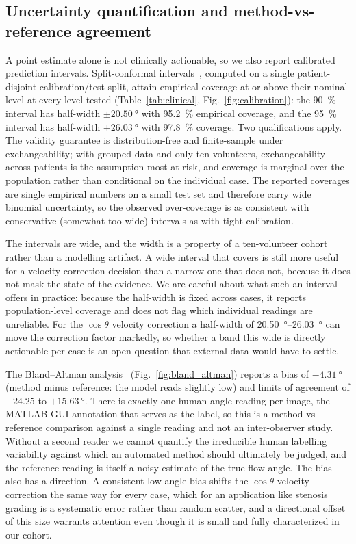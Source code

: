 \subsection{Uncertainty quantification and method-vs-reference agreement}

A point estimate alone is not clinically actionable, so we also report calibrated
prediction intervals. Split-conformal intervals~\citep{Vovk2005,Lei2018}, computed
on a single patient-disjoint calibration/test split, attain empirical coverage at or
above their nominal level at every level tested (Table~\ref{tab:clinical},
Fig.~\ref{fig:calibration}): the \SI{90}{\percent} interval has half-width
$\pm\SI{20.50}{\degree}$ with \SI{95.2}{\percent} empirical coverage, and the
\SI{95}{\percent} interval has half-width $\pm\SI{26.03}{\degree}$ with
\SI{97.8}{\percent} coverage. Two qualifications apply. The validity guarantee is
distribution-free and finite-sample under exchangeability; with grouped data and
only ten volunteers, exchangeability across patients is the assumption most at risk,
and coverage is marginal over the population rather than conditional on the
individual case. The reported coverages are single empirical numbers on a small test
set and therefore carry wide binomial uncertainty, so the observed over-coverage is
as consistent with conservative (somewhat too wide) intervals as with tight
calibration.

The intervals are wide, and the width is a property of a ten-volunteer cohort rather
than a modelling artifact. A wide interval that covers is still more useful for a
velocity-correction decision than a narrow one that does not, because it does not
mask the state of the evidence. We are careful about what such an interval offers in
practice: because the half-width is fixed across cases, it reports population-level
coverage and does not flag which individual readings are unreliable. For the
$\cos\theta$ velocity correction a half-width of \SIrange{20.50}{26.03}{\degree} can
move the correction factor markedly, so whether a band this wide is directly
actionable per case is an open question that external data would have to settle.

The Bland--Altman analysis~\citep{BlandAltman1986} (Fig.~\ref{fig:bland_altman})
reports a bias of $-\SI{4.31}{\degree}$ (method minus reference: the model reads
slightly low) and limits of agreement of $-24.25$ to $+\SI{15.63}{\degree}$. There
is exactly one human angle reading per image, the MATLAB-GUI annotation that serves
as the label, so this is a method-vs-reference comparison against a single reading
and not an inter-observer study. Without a second reader we cannot quantify the
irreducible human labelling variability against which an automated method should
ultimately be judged, and the reference reading is itself a noisy estimate of the
true flow angle. The bias also has a direction. A consistent low-angle bias shifts
the $\cos\theta$ velocity correction the same way for every case, which for an
application like stenosis grading is a systematic error rather than random scatter,
and a directional offset of this size warrants attention even though it is small and
fully characterized in our cohort.

